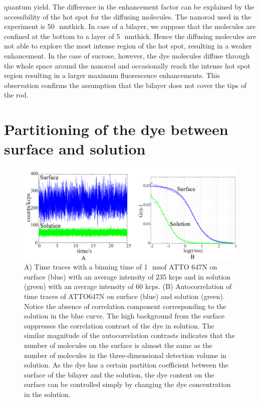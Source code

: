 \documentclass[11pt,a4paper,onecolumn]{article}
\newcommand{\nm}{\ensuremath{\,\textrm{nm}}}
\newcommand{\ms}{\ensuremath{\,\textrm{ms}}}
\begin{document}
quantum yield. The difference in the enhancement factor can be explained by the accessibility of the hot spot for 
the diffusing molecules. The nanorod used in the experiment is 50~\nm thick. In case of a bilayer, we suppose that 
the molecules are confined at the bottom to a layer of 5~\nm thick. Hence the diffusing molecules are not able to 
explore the most intense region of the hot spot, resulting in a weaker enhancement. In the case of sucrose, however, 
the dye molecules diffuse through the whole space around the nanorod and occasionally reach the intense hot spot 
region resulting in a larger maximum fluorescence enhancements. This observation confirms the assumption that the 
bilayer does not cover the tips of the rod.\\
\newpage
\section{Partitioning of the dye between surface and solution}
\begin{figure}[ht]
  \centering
  \includegraphics[width=\textwidth]{surf_soln.png}
  \makeatletter
  \renewcommand{\fnum@figure}{\figurename~S\thefigure}
  \makeatother{}
  \caption{A) Time traces with a binning time of 1~\ms of ATTO 647N on surface (blue) with an average intensity of 
  235 kcps and in solution (green) with an average intensity of 60 kcps. (B) Autocorrelation of time traces of 
  ATTO647N on surface (blue) and solution (green). Notice the absence of correlation component corresponding to the 
  solution in the blue curve. The high background from the surface suppresses the correlation contrast of the dye
   in solution. The similar magnitude of the autocorrelation contrasts indicates that the number of molecules on 
   the surface is almost the same as the number of molecules in the three-dimensional detection volume in solution. 
   As the dye has a certain partition coefficient between the surface of the bilayer and the solution, the dye content 
   on the surface can be controlled simply by changing the dye concentration in the solution.}
  \label{SIfig:surf-soln}
\end{figure}

\pagebreak

\end{document}
